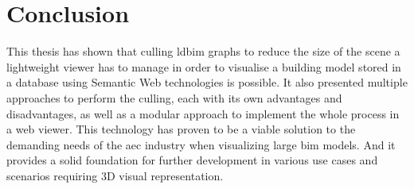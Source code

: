 \section{Conclusion}

This thesis has shown that culling \ac{ldbim} graphs to reduce the size of the scene a lightweight viewer has to manage in order to visualise a building model stored in a database using Semantic Web technologies is possible. It also presented multiple approaches to perform the culling, each with its own advantages and disadvantages, as well as a modular approach to implement the whole process in a web viewer. This technology has proven to be a viable solution to the demanding needs of the \ac{aec} industry when visualizing large \ac{bim} models. And it provides a solid foundation for further development in various use cases and scenarios requiring 3D visual representation.